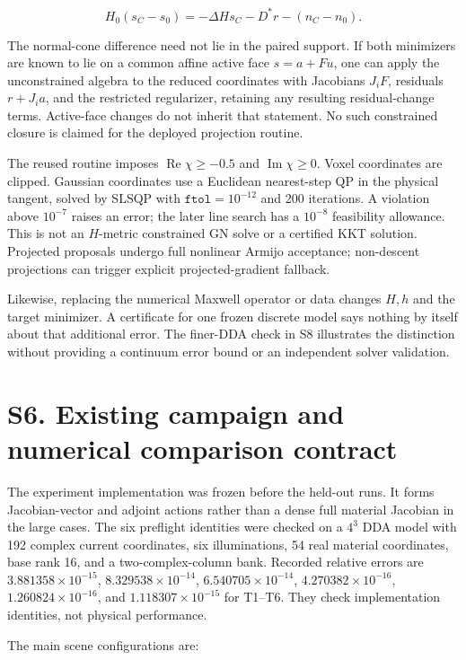 \documentclass[11pt]{article}
\begin{document}
\[
H_0(s_C-s_0)=-\Delta Hs_C-D^*r-(n_C-n_0). \tag{S13}
\]

The normal-cone difference need not lie in the paired support. If both minimizers are known to lie on a common affine active face \(s=a+Fu\), one can apply the unconstrained algebra to the reduced coordinates with Jacobians \(J_iF\), residuals \(r+J_ia\), and the restricted regularizer, retaining any resulting residual-change terms. Active-face changes do not inherit that statement. No such constrained closure is claimed for the deployed projection routine.

The reused routine imposes \(\operatorname{Re}\chi\ge-0.5\) and \(\operatorname{Im}\chi\ge0\). Voxel coordinates are clipped. Gaussian coordinates use a Euclidean nearest-step QP in the physical tangent, solved by SLSQP with \(\texttt{ftol}=10^{-12}\) and 200 iterations. A violation above \(10^{-7}\) raises an error; the later line search has a \(10^{-8}\) feasibility allowance. This is not an \(H\)-metric constrained GN solve or a certified KKT solution. Projected proposals undergo full nonlinear Armijo acceptance; non-descent projections can trigger explicit projected-gradient fallback.

Likewise, replacing the numerical Maxwell operator or data changes \(H,h\) and the target minimizer. A certificate for one frozen discrete model says nothing by itself about that additional error. The finer-DDA check in S8 illustrates the distinction without providing a continuum error bound or an independent solver validation.

\section*{S6. Existing campaign and numerical comparison contract}

The experiment implementation was frozen before the held-out runs. It forms Jacobian-vector and adjoint actions rather than a dense full material Jacobian in the large cases. The six preflight identities were checked on a \(4^3\) DDA model with 192 complex current coordinates, six illuminations, 54 real material coordinates, base rank 16, and a two-complex-column bank. Recorded relative errors are \(3.881358\times10^{-15}\), \(8.329538\times10^{-14}\), \(6.540705\times10^{-14}\), \(4.270382\times10^{-16}\), \(1.260824\times10^{-16}\), and \(1.118307\times10^{-15}\) for T1--T6. They check implementation identities, not physical performance.

The main scene configurations are:
\end{document}
